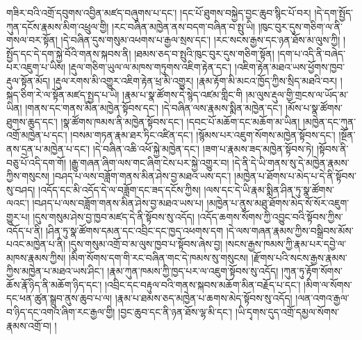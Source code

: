 གཟིར་བའི་འགྲོ་དབུགས་འབྱིན་མཛད་བཞུགས་པ་དང་། །དང་པོ་ཐུགས་བསྐྱེད་བྱང་ཆུབ་སྙིང་པོ་བར། །དེ་དག་སྤྱོད་ཀུན་དངོས་རྣམས་མིག་འཕྲུལ་གྱི། །རང་བཞིན་མཁྱེན་ནས་བདག་བཞིན་བ་སྤུ་ཡི། །ཁུང་བུར་དུས་གཅིག་ལ་ནི་གསལ་བར་སྟོན། །དེ་བཞིན་དུས་གསུམ་འཕགས་པ་རྒྱལ་སྲས་དང་། །རང་སངས་རྒྱས་དང་ཉན་ཐོས་མ་ལུས་ཀྱི། །སྤྱོད་དང་དེ་དག་སྐྱེ་བོའི་གནས་སྐབས་ནི། །ཐམས་ཅད་བ་སྤུའི་ཁུང་བུར་དུས་གཅིག་སྟོན། །དག་པ་འདི་ནི་བཞེད་པར་འཇུག་པ་ཡིས། །རྡུལ་གཅིག་ཡུལ་ལ་མཁས་གཏུགས་འཇིག་རྟེན་དང་། །འཇིག་རྟེན་མཐའ་ཡས་ཕྱོགས་ཁྱབ་རྡུལ་སྟོན་མོད། །རྡུལ་རགས་མི་འགྱུར་འཇིག་རྟེན་ཕྲ་མི་འགྱུར། །རྣམ་རྟོག་མི་མངའ་ཁྱོད་ཀྱིས་སྲིད་མཐའི་བར། །སྐད་ཅིག་རེ་ལ་སྟོན་མཛད་སྤྱད་པ་ཡི། །རྣམ་པ་སྣ་ཚོགས་དེ་སྙེད་འཛམ་གླིང་གི །མ་ལུས་རྡུལ་གྱི་གྲངས་ལ་ཡོད་མ་ཡིན། །གནས་དང་གནས་མིན་མཁྱེན་སྟོབས་དང་། །དེ་བཞིན་ལས་རྣམས་སྨིན་མཁྱེན་དང་། །མོས་པ་སྣ་ཚོགས་ཐུགས་ཆུད་དང་། །སྣ་ཚོགས་ཁམས་ནི་མཁྱེན་སྟོབས་དང་། །དབང་པོ་མཆོག་དང་མཆོག་མ་ཡིན། །མཁྱེན་དང་ཀུན་འགྲོ་མཁྱེན་པ་དང་། །བསམ་གཏན་རྣམ་ཐར་ཏིང་འཛིན་དང་། །སྙོམས་པར་འཇུག་སོགས་མཁྱེན་སྟོབས་དང་། །སྔོན་ནས་དྲན་པ་མཁྱེན་པ་དང་། །དེ་བཞིན་འཆི་འཕོ་སྐྱེ་མཁྱེན་དང་། །ཟག་པ་རྣམས་ཟད་མཁྱེན་སྟོབས་ཏེ། །སྟོབས་ནི་བཅུ་པོ་འདི་དག་གོ། །རྒྱུ་གཞན་ཞིག་ལས་གང་ཞིག་ངེས་པར་སྐྱེ་འགྱུར་བ། །དེ་ནི་དེ་ཡི་གནས་སུ་དེ་མཁྱེན་རྣམས་ཀྱིས་གསུངས། །བཤད་པ་ལས་བཟློག་གནས་མིན་ཤེས་བྱ་མཐའ་ཡས་དང་། །མཁྱེན་པ་ཐོགས་པ་མེད་པ་དེ་ནི་སྟོབས་སུ་བཤད། །འདོད་དང་མི་འདོད་དེ་ལ་བཟློག་དང་ཟད་དངོས་ཀྱིས། །ལས་དང་དེ་ཡི་རྣམ་སྨིན་ཤིན་ཏུ་སྣ་ཚོགས་ལའང་། །བཤད་པ་ལས་བཟློག་གནས་མིན་ཤེས་བྱ་མཐའ་ཡས་པ། །མཁྱེན་པ་ནུས་མཐུ་ཐོགས་མེད་སོ་སོར་འཇུག་གྱུར་པ། །དུས་གསུམ་ཤེས་བྱ་ཁྱབ་མཛད་དེ་ནི་སྟོབས་སུ་འདོད། །འདོད་ཆགས་སོགས་ཀྱི་འབྱུང་བའི་སྟོབས་ཀྱིས་འདོད་པ་ནི། །ཤིན་ཏུ་སྣ་ཚོགས་དམན་དང་འབྲིང་དང་ཁྱད་འཕགས་དག །དེ་ལས་གཞན་རྣམས་ཀྱིས་བསྒྲིབས་མོས་པའང་མཁྱེན་པ་ནི། །དུས་གསུམ་འགྲོ་བ་མ་ལུས་ཁྱབ་པ་སྟོབས་ཞེས་བྱ། །སངས་རྒྱས་ཁམས་ཀྱི་རྣམ་པར་དབྱེ་ལ་མཁས་རྣམས་ཀྱིས། །མིག་སོགས་དག་གི་རང་བཞིན་གང་དེ་ཁམས་སུ་གསུངས། །རྫོགས་པའི་སངས་རྒྱས་རྣམས་ཀྱིས་མཁྱེན་པ་མཐའ་ཡས་ཤིང་། །རྣམ་ཀུན་ཁམས་ཀྱི་ཁྱད་པར་ལ་འཇུག་སྟོབས་སུ་འདོད། །ཀུན་ཏུ་རྟོག་སོགས་ཆོས་རྣོ་ཉིད་ནི་མཆོག་ཉིད་དང་། །འབྲིང་དང་བརྟུལ་བའི་གནས་སྐབས་མཆོག་མིན་བརྗོད་པ་དང་། །མིག་ལ་སོགས་དང་ཕན་ཚུན་སྒྲུབ་ནུས་ཆུབ་པ་ལ། །རྣམ་པ་ཐམས་ཅད་མཁྱེན་པ་ཆགས་མེད་སྟོབས་སུ་འདོད། །ལན་འགའ་རྒྱལ་བ་ཉིད་དང་འགའ་ཞིག་རང་རྒྱལ་གྱི། །བྱང་ཆུབ་དང་ནི་ཉན་ཐོས་ལྷ་མི་དང་། །ཡི་དྭགས་དུད་འགྲོ་དམྱལ་སོགས་རྣམས་འགྲོ་བ། །
